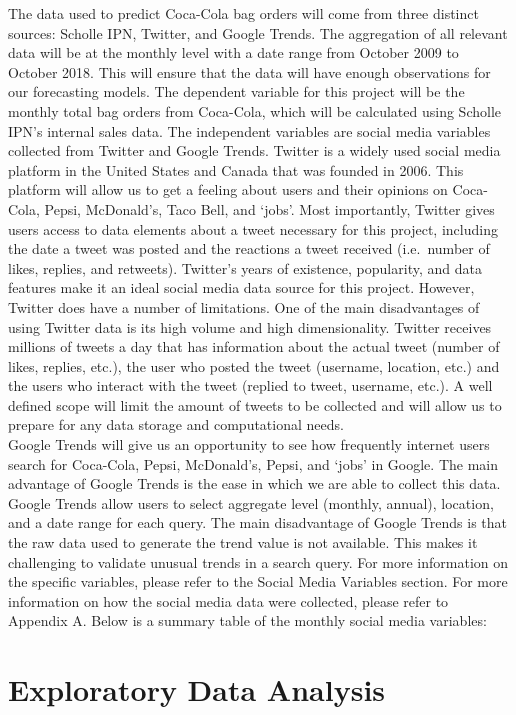 \documentclass[12pt,oneside]{chicagocapstone}
\begin{document}
The data used to predict Coca-Cola bag orders will come from three
distinct sources: Scholle IPN, Twitter, and Google Trends. The
aggregation of all relevant data will be at the monthly level with a
date range from October 2009 to October 2018. This will ensure that the
data will have enough observations for our forecasting models. The
dependent variable for this project will be the monthly total bag orders
from Coca-Cola, which will be calculated using Scholle IPN's internal
sales data. The independent variables are social media variables
collected from Twitter and Google Trends. Twitter is a widely used
social media platform in the United States and Canada that was founded
in 2006. This platform will allow us to get a feeling about users and
their opinions on Coca-Cola, Pepsi, McDonald's, Taco Bell, and `jobs'.
Most importantly, Twitter gives users access to data elements about a
tweet necessary for this project, including the date a tweet was posted
and the reactions a tweet received (i.e.~number of likes, replies, and
retweets). Twitter's years of existence, popularity, and data features
make it an ideal social media data source for this project. However,
Twitter does have a number of limitations. One of the main disadvantages
of using Twitter data is its high volume and high dimensionality.
Twitter receives millions of tweets a day that has information about the
actual tweet (number of likes, replies, etc.), the user who posted the
tweet (username, location, etc.) and the users who interact with the
tweet (replied to tweet, username, etc.). A well defined scope will
limit the amount of tweets to be collected and will allow us to prepare
for any data storage and computational needs.\\
Google Trends will give us an opportunity to see how frequently internet
users search for Coca-Cola, Pepsi, McDonald's, Pepsi, and `jobs' in
Google. The main advantage of Google Trends is the ease in which we are
able to collect this data. Google Trends allow users to select aggregate
level (monthly, annual), location, and a date range for each query. The
main disadvantage of Google Trends is that the raw data used to generate
the trend value is not available. This makes it challenging to validate
unusual trends in a search query. For more information on the specific
variables, please refer to the Social Media Variables section. For more
information on how the social media data were collected, please refer to
Appendix A. Below is a summary table of the monthly social media
variables:

\section*{Exploratory Data Analysis}\label{methodology-descriptive}
\end{document}
